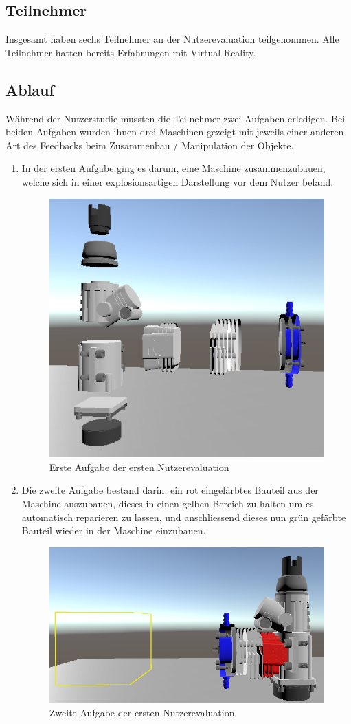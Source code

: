 \subsection{Teilnehmer}
Insgesamt haben sechs Teilnehmer an der Nutzerevaluation teilgenommen. Alle Teilnehmer hatten bereits Erfahrungen mit Virtual Reality. 

\subsection{Ablauf}
Während der Nutzerstudie mussten die Teilnehmer zwei Aufgaben erledigen. Bei beiden Aufgaben wurden ihnen drei Maschinen gezeigt mit jeweils einer anderen Art des Feedbacks beim Zusammenbau / Manipulation der Objekte.
\begin{enumerate}
	\item In der ersten Aufgabe ging es darum, eine Maschine zusammenzubauen, welche sich in einer explosionsartigen Darstellung vor dem Nutzer befand. 
	
	\begin{figure}[h!]
		\centering
		\includegraphics[keepaspectratio,width=0.4\linewidth]{img/Evaluation_Task1.PNG}
		\caption{Erste Aufgabe der ersten Nutzerevaluation}
		\label{fig:evaluation1_task1}
	\end{figure}
	
	\item Die zweite Aufgabe bestand darin, ein rot eingefärbtes Bauteil aus der Maschine auszubauen, dieses in einen gelben Bereich zu halten um es automatisch reparieren zu lassen, und anschliessend dieses nun grün gefärbte Bauteil wieder in der Maschine einzubauen.
	
	\begin{figure}[h!]
		\centering
		\includegraphics[keepaspectratio,width=0.4\linewidth]{img/Evaluation_Task2.PNG}
		\caption{Zweite Aufgabe der ersten Nutzerevaluation}
		\label{fig:evaluation1_task2}
	\end{figure}
	
\end{enumerate}

